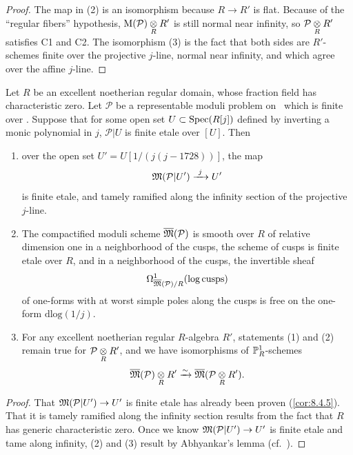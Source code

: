 \begin{proof}
The map in (2) is an isomorphism because $R \to R'$ is flat. Because of the ``regular fibers'' hypothesis, $\mathrm{M}(\mathcal{P}) \underset{R}{\otimes} R'$ is still normal near infinity, so $\mathcal{P} \underset{R}{\otimes} R'$ satisfies C1 and C2. The isomorphism (3) is the fact that both sides are $R'$-schemes finite over the projective $j$-line, normal near infinity, and which agree over the affine $j$-line.
\end{proof}

\begin{kthm}\label{thm:8.6.8}
Let $R$ be an excellent noetherian regular domain, whose fraction field has characteristic zero. Let $\mathcal{P}$ be a representable moduli problem on \EllR\ which is finite over \EllR. Suppose that for some open set $U \subset \operatorname{Spec}(R[j])$ defined by inverting a monic polynomial in $j$, $\mathcal{P}|U$ is finite etale over $[U]$. Then
\begin{enumerate}[(1)]
\item over the open set $U' = U[1/(j(j-1728))]$, the map
\[
\mathfrak{M}(\mathcal{P}|U') \xrightarrow{\ j\ } U'
\]
is finite etale, and tamely ramified along the infinity section of the projective $j$-line.
\item The compactified moduli scheme $\overline{\mathfrak{M}}(\mathcal{P})$ is smooth over $R$ of relative dimension one in a neighborhood of the cusps, the scheme of cusps is finite etale over $R$, and in a neighborhood of the cusps, the invertible sheaf
\[
\Omega^1_{\overline{\mathfrak{M}}(\mathcal{P})/R}(\log \mathrm{cusps})
\]
of one-forms with at worst simple poles along the cusps is free on the one-form $\mathrm{dlog}(1/j)$.
\item For any excellent noetherian regular $R$-algebra $R'$, statements (1) and (2) remain true for $\mathcal{P} \underset{R}{\otimes} R'$, and we have isomorphisms of $\mathbb{P}^1_R$-schemes
\[
\overline{\mathfrak{M}}(\mathcal{P}) \underset{R}{\otimes} R' \xrightarrow{\sim} \overline{\mathfrak{M}}(\mathcal{P} \underset{R}{\otimes} R') .
\]
\end{enumerate}
\end{kthm}

\begin{proof}
That $\mathfrak{M}(\mathcal{P}|U') \to U'$ is finite etale has already been proven (\ref{cor:8.4.5}). That it is tamely ramified along the infinity section results from the fact that $R$ has generic characteristic zero. Once we know $\mathfrak{M}(\mathcal{P}|U') \to U'$ is finite etale and tame along infinity, (2) and (3) result by Abhyankar's lemma (cf.\ \cite[I, Exp.~XIII, 5.5]{SGA}).
\end{proof}

